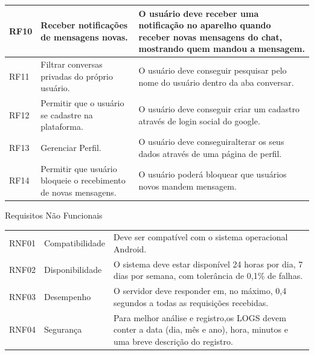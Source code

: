 \begin{longtable}{|p{2.0cm}|p{6.5cm}|p{6.5cm}|}
	\hline
	RF10 &Receber notificações de mensagens novas. &
	O usuário deve receber uma notificação no aparelho quando receber novas mensagens do chat, mostrando quem mandou a mensagem.\\
	\hline
	RF11 & Filtrar conversas privadas do próprio usuário.  & O usuário deve conseguir pesquisar pelo nome do usuário dentro da aba conversar.\\
	\hline
	RF12 & Permitir que o usuário se cadastre na plataforma. & O usuário deve conseguir criar um cadastro através de login social do google.\\
	\hline
	RF13 & Gerenciar Perfil.  &
	O usuário deve conseguiralterar os seus dados através de uma página de perfil.  \\
	\hline
	RF14 & Permitir que usuário bloqueie o recebimento de novas mensagens.  & O usuário poderá bloquear que usuários novos mandem mensagem.\\
	\hline
\end{longtable}

\begin{quadro}[htb]
	\centering
	\ABNTEXfontereduzida
	\caption[Requisitos Não Funcionais]{Requisitos Não Funcionais}
	\label{requisitos-nao-funcionais}
	\begin{tabular}{|p{2.0cm}|p{6.5cm}|p{6.5cm}|}
		\hline
		\thead{Código} & \thead{Categoria}  & \thead{Requisito} \\
		\hline
		RNF01 & Compatibilidade &
		Deve ser compatível com o sistema operacional Android.\\
		\hline
		RNF02 & Disponibilidade & O sistema deve estar disponível 24 horas por dia, 7 dias por semana, com tolerância de 0,1\% de falhas. \\
		\hline
		RNF03 & Desempenho & O servidor deve responder em, no máximo, 0,4 segundos a todas as requisições recebidas. \\
		\hline
		RNF04 & Segurança & Para melhor análise e registro,os LOGS devem conter a data (dia, mês e ano), hora, minutos e uma breve descrição do registro.\\
		\hline
	\end{tabular}
\end{quadro}



